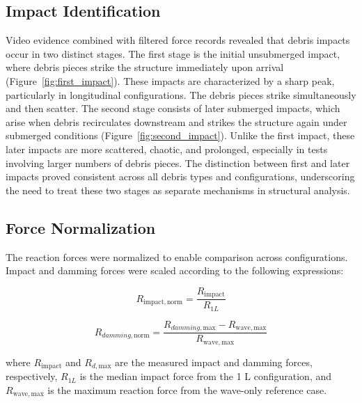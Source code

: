 \documentclass{article}
\begin{document}
{\subsection{Impact Identification}
Video evidence combined with filtered force records revealed that debris impacts occur in two distinct stages. The first stage is the initial unsubmerged impact, where debris pieces strike the structure immediately upon arrival (Figure~\ref{fig:first_impact}). These impacts are characterized by a sharp peak, particularly in longitudinal configurations. The debris pieces strike simultaneously and then scatter. The second stage consists of later submerged impacts, which arise when debris recirculates downstream and strikes the structure again under submerged conditions (Figure~\ref{fig:second_impact}). Unlike the first impact, these later impacts are more scattered, chaotic, and prolonged, especially in tests involving larger numbers of debris pieces. The distinction between first and later impacts proved consistent across all debris types and configurations, underscoring the need to treat these two stages as separate mechanisms in structural analysis.

\subsection{Force Normalization}

The reaction forces were normalized to enable comparison across configurations. 
Impact and damming forces were scaled according to the following expressions:

\begin{equation}
    R_{\mathrm{impact,norm}} = 
    \frac{R_{\mathrm{impact}}}{R_{1L}}
    \label{eq:impact_norm}
\end{equation}

\begin{equation}
    R_{damming,\mathrm{norm}} = 
    \frac{R_{damming,\mathrm{max}} - R_{\mathrm{wave,max}}}
         {R_{\mathrm{wave,max}}}
    \label{eq:damming_norm}
\end{equation}

where \( R_{\mathrm{impact}} \) and \( R_{d,\mathrm{max}} \) are the measured impact and damming forces, respectively, 
\( R_{1L} \) is the median impact force from the 1 L configuration, 
and \( R_{\mathrm{wave,max}} \) is the maximum reaction force from the wave-only reference case.


}
\end{document}
